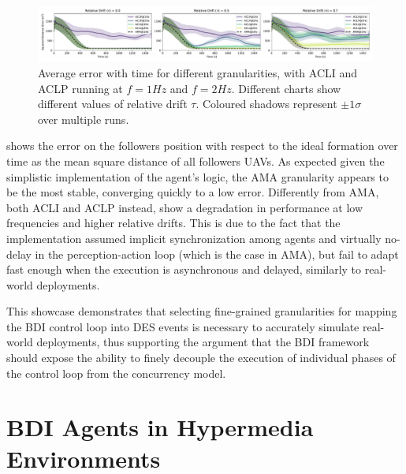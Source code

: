\begin{figure}
    \centering
    \includegraphics[width=\linewidth]{figures/jakta+alchemist/error_over_time_flattened.pdf}
    \caption{
        Average error with time for different granularities, with \ac{ACLI} and \ac{ACLP} running at $f=1Hz$ and $f=2Hz$.
        Different charts show different values of relative drift $\tau$.
        Coloured shadows represent $\pm 1\sigma$ over multiple runs.
    }
    \label{subfig:err_time}
\end{figure}
%
 shows the error on the followers position with respect to the ideal formation over time as the mean square distance of all followers \acp{UAV}.
As expected given the simplistic implementation of the agent's logic, the \ac{AMA} granularity appears to be the most stable, converging quickly to a low error.
%
Differently from \ac{AMA}, both \ac{ACLI} and \ac{ACLP} instead, show a degradation in performance at low frequencies and higher relative drifts.
%
This is due to the fact that the implementation assumed implicit synchronization among agents and virtually no-delay in the perception-action loop (which is the case in \ac{AMA}), but fail to adapt fast enough when the execution is asynchronous and delayed, similarly to real-world deployments.

This showcase demonstrates that selecting fine-grained granularities for mapping the \ac{BDI} control loop into \ac{DES} events is necessary to accurately simulate real-world deployments, thus supporting the argument that the \ac{BDI} framework should expose the ability to finely decouple the execution of individual phases of the control loop from the concurrency model.

\section{BDI Agents in Hypermedia Environments}

